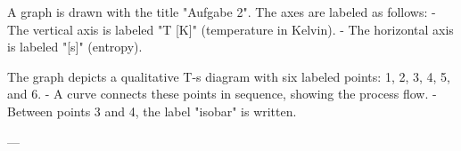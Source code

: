A graph is drawn with the title "Aufgabe 2". The axes are labeled as follows:  
- The vertical axis is labeled "T [K]" (temperature in Kelvin).  
- The horizontal axis is labeled "[s]" (entropy).  

The graph depicts a qualitative T-s diagram with six labeled points: 1, 2, 3, 4, 5, and 6.  
- A curve connects these points in sequence, showing the process flow.  
- Between points 3 and 4, the label "isobar" is written.  

---
